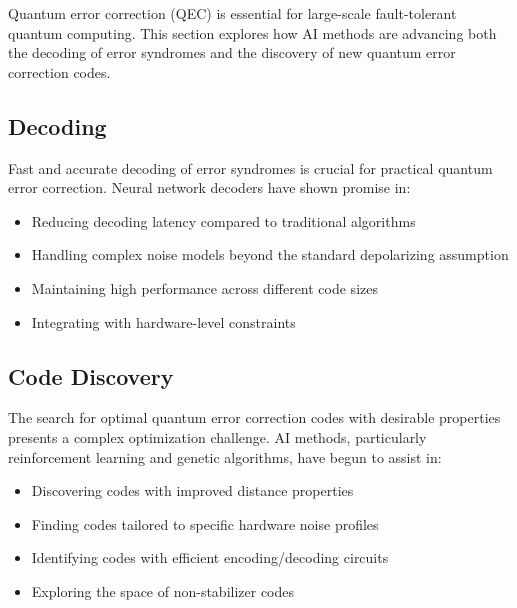 Quantum error correction (QEC) is essential for large-scale fault-tolerant quantum computing. This section explores how AI methods are advancing both the decoding of error syndromes and the discovery of new quantum error correction codes.

\subsection{Decoding}
Fast and accurate decoding of error syndromes is crucial for practical quantum error correction. Neural network decoders have shown promise in:

\begin{itemize}
    \item Reducing decoding latency compared to traditional algorithms
    \item Handling complex noise models beyond the standard depolarizing assumption
    \item Maintaining high performance across different code sizes
    \item Integrating with hardware-level constraints
\end{itemize}

\subsection{Code Discovery}
The search for optimal quantum error correction codes with desirable properties presents a complex optimization challenge. AI methods, particularly reinforcement learning and genetic algorithms, have begun to assist in:

\begin{itemize}
    \item Discovering codes with improved distance properties
    \item Finding codes tailored to specific hardware noise profiles
    \item Identifying codes with efficient encoding/decoding circuits
    \item Exploring the space of non-stabilizer codes
\end{itemize} 